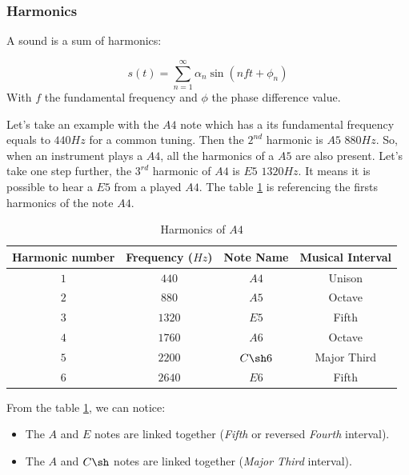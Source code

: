 \documentclass[12pt]{report}
\begin{document}
\subsubsection{Harmonics}

A sound is a sum of harmonics:

\begin{equation}
    s(t) = \sum_{n=1}^{\infty} \alpha_{n} \sin(n f t + \phi_{n})
\end{equation}
With $f$ the fundamental frequency and $\phi$ the phase difference value.

Let's take an example with the $A4$ note which has a its fundamental frequency equals to $440 Hz$ for a common tuning.
Then the $2^{nd}$ harmonic is $A5$ $880Hz$. So, when an instrument plays a $A4$, all the harmonics of a $A5$ are also present.
Let's take one step further, the $3^{rd}$ harmonic of $A4$ is $E5$ $1320Hz$. It means it is possible to hear a $E5$ from a played $A4$.
The table \ref{tab:A4_harmonics} is referencing the firsts harmonics of the note $A4$.

\begin{table} [ht]
    \begin{center}
        \begin{tabular} {c||c|c|c}
            Harmonic number & Frequency ($Hz$) & Note Name & Musical Interval \\
            \hline
            $1$ & $440$ & $A4$ & Unison \\
            $2$ & $880$ & $A5$ & Octave \\
            $3$ & $1320$ & $E5$ & Fifth \\
            $4$ & $1760$ & $A6$ & Octave \\
            $5$ & $2200$ & $C\sh6$ & Major Third \\
            $6$ & $2640$ & $E6$ & Fifth \\
        \end{tabular}
        \caption{Harmonics of $A4$}
        \label{tab:A4_harmonics}
    \end{center}
\end{table}
From the table \ref{tab:A4_harmonics}, we can notice:
\begin{itemize}
    \item The $A$ and $E$ notes are linked together (\textit{Fifth} or reversed \textit{Fourth} interval).
    \item The $A$ and $C\sh$ notes are linked together (\textit{Major Third} interval).
\end{itemize}
\end{document}
